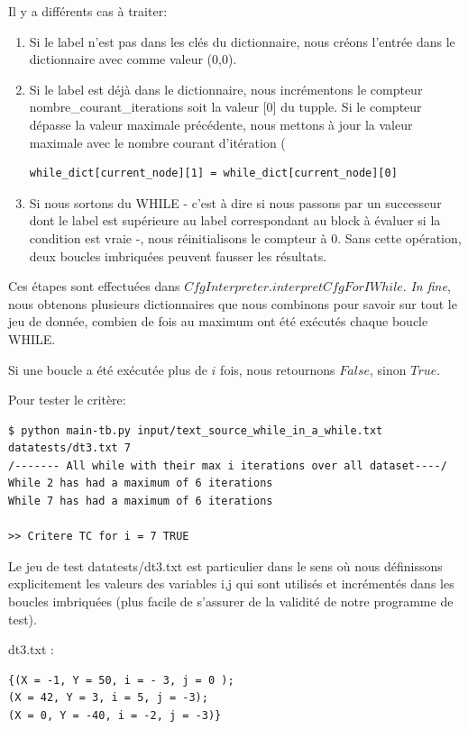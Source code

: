 \documentclass[a4paper]{article}
\begin{document}
Il y a différents cas à traiter:
\begin{enumerate}
\item Si le label n'est pas dans les clés du dictionnaire, nous créons l'entrée dans le dictionnaire avec comme valeur (0,0).
\item Si le label est déjà dans le dictionnaire, nous incrémentons le compteur nombre\_courant\_iterations soit la valeur [0] du tupple. Si le compteur dépasse la valeur maximale précédente, nous mettons à jour la valeur maximale avec le nombre courant d'itération (  
\begin{verbatim}
while_dict[current_node][1] = while_dict[current_node][0]
\end{verbatim}
\item Si nous sortons du WHILE - c'est à dire si nous passons par un successeur dont le label est supérieure au label correspondant au block à évaluer si la condition est vraie -, nous réinitialisons le compteur à 0. Sans cette opération, deux boucles imbriquées peuvent fausser les résultats. 
\end{enumerate}

Ces étapes sont effectuées dans $CfgInterpreter.interpretCfgForIWhile$. 
\textit{In fine}, nous obtenons plusieurs dictionnaires que nous combinons pour savoir sur tout le jeu de donnée, combien de fois au maximum ont été exécutés chaque boucle WHILE.

Si une boucle a été exécutée plus de $i$ fois, nous retournons $False$, sinon $True$.

Pour tester le critère:
\begin{verbatim}
$ python main-tb.py input/text_source_while_in_a_while.txt datatests/dt3.txt 7
/------- All while with their max i iterations over all dataset----/
While 2 has had a maximum of 6 iterations
While 7 has had a maximum of 6 iterations

>> Critere TC for i = 7 TRUE
\end{verbatim}

Le jeu de test datatests/dt3.txt est particulier dans le sens où nous définissons explicitement les valeurs des variables i,j qui sont utilisés et incrémentés dans les boucles imbriquées (plus facile de s'assurer de la validité de notre programme de test). 

dt3.txt : 
\begin{verbatim}
{(X = -1, Y = 50, i = - 3, j = 0 );
(X = 42, Y = 3, i = 5, j = -3);
(X = 0, Y = -40, i = -2, j = -3)}
\end{verbatim}
\end{document}

